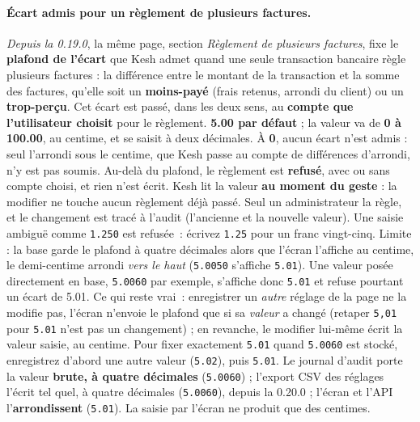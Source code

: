 \documentclass[a4paper,11pt,oneside]{article}
\begin{document}
\paragraph{Écart admis pour un règlement de plusieurs factures.}\label{sec:ecart-admis-reglement-groupe} \emph{Depuis la 0.19.0}, la même page, section \emph{Règlement de plusieurs factures}, fixe le \textbf{plafond de l'écart} que Kesh admet quand une seule transaction bancaire règle plusieurs factures : la différence entre le montant de la transaction et la somme des factures, qu'elle soit un \textbf{moins-payé} (frais retenus, arrondi du client) ou un \textbf{trop-perçu}. Cet écart est passé, dans les deux sens, au \textbf{compte que l'utilisateur choisit} pour le règlement. \textbf{5.00 par défaut} ; la valeur va de \textbf{0 à 100.00}, au centime, et se saisit à deux décimales. À \textbf{0}, aucun écart n'est admis : seul l'arrondi sous le centime, que Kesh passe au compte de différences d'arrondi, n'y est pas soumis. Au-delà du plafond, le règlement est \textbf{refusé}, avec ou sans compte choisi, et rien n'est écrit. Kesh lit la valeur \textbf{au moment du geste} : la modifier ne touche aucun règlement déjà passé. Seul un administrateur la règle, et le changement est tracé à l'audit (l'ancienne et la nouvelle valeur). Une saisie ambiguë comme \texttt{1.250} est refusée~: écrivez \texttt{1.25} pour un franc vingt-cinq. Limite : la base garde le plafond à quatre décimales alors que l'écran l'affiche au centime, le demi-centime arrondi \emph{vers le haut} (\texttt{5.0050} s'affiche \texttt{5.01}). Une valeur posée directement en base, \texttt{5.0060} par exemple, s'affiche donc \texttt{5.01} et refuse pourtant un écart de 5.01. Ce qui reste vrai~: enregistrer un \emph{autre} réglage de la page ne la modifie pas, l'écran n'envoie le plafond que si sa \emph{valeur} a changé (retaper \texttt{5,01} pour \texttt{5.01} n'est pas un changement) ; en revanche, le modifier lui-même écrit la valeur saisie, au centime. Pour fixer exactement \texttt{5.01} quand \texttt{5.0060} est stocké, enregistrez d'abord une autre valeur (\texttt{5.02}), puis \texttt{5.01}. Le journal d'audit porte la valeur \textbf{brute, à quatre décimales} (\texttt{5.0060}) ; l'export CSV des réglages l'écrit tel quel, à quatre décimales (\texttt{5.0060}), depuis la 0.20.0 ; l'écran et l'API l'\textbf{arrondissent} (\texttt{5.01}). La saisie par l'écran ne produit que des centimes.
\end{document}
